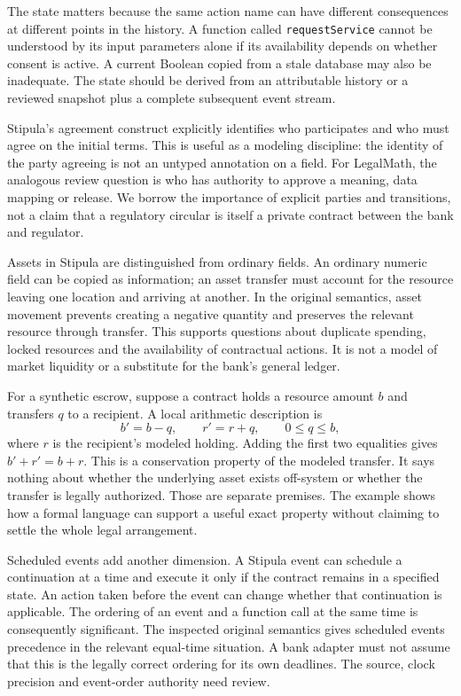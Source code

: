 The state matters because the same action name can have different consequences
at different points in the history. A function called \texttt{requestService}
cannot be understood by its input parameters alone if its availability depends
on whether consent is active. A current Boolean copied from a stale database
may also be inadequate. The state should be derived from an attributable
history or a reviewed snapshot plus a complete subsequent event stream.

Stipula's agreement construct explicitly identifies who participates and who
must agree on the initial terms. This is useful as a modeling discipline:
the identity of the party agreeing is not an untyped annotation on a field.
For LegalMath, the analogous review question is who has authority to approve a
meaning, data mapping or release. We borrow the importance of explicit parties
and transitions, not a claim that a regulatory circular is itself a private
contract between the bank and regulator.


Assets in Stipula are distinguished from ordinary fields. An ordinary numeric
field can be copied as information; an asset transfer must account for the
resource leaving one location and arriving at another. In the original
semantics, asset movement prevents creating a negative quantity and preserves
the relevant resource through transfer. This supports questions about duplicate
spending, locked resources and the availability of contractual actions. It is
not a model of market liquidity or a substitute for the bank's general ledger.

For a synthetic escrow, suppose a contract holds a resource amount $b$ and
transfers $q$ to a recipient. A local arithmetic description is
\begin{equation}
 b'=b-q,\qquad r'=r+q,\qquad 0\leq q\leq b,
 \label{eq:asset-transfer}
\end{equation}
where $r$ is the recipient's modeled holding. Adding the first two equalities
gives $b'+r'=b+r$. This is a conservation property of the modeled transfer.
It says nothing about whether the underlying asset exists off-system or whether
the transfer is legally authorized. Those are separate premises. The example
shows how a formal language can support a useful exact property without
claiming to settle the whole legal arrangement.

Scheduled events add another dimension. A Stipula event can schedule a
continuation at a time and execute it only if the contract remains in a
specified state. An action taken before the event can change whether that
continuation is applicable. The ordering of an event and a function call at
the same time is consequently significant. The inspected original semantics
gives scheduled events precedence in the relevant equal-time situation. A bank
adapter must not assume that this is the legally correct ordering for its own
deadlines. The source, clock precision and event-order authority need review.

